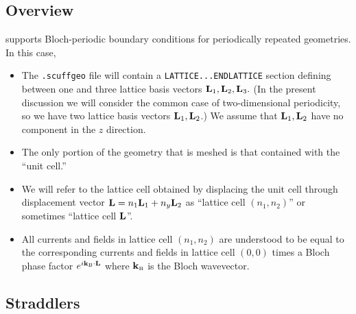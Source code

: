 \subsection{Overview}

\lss supports Bloch-periodic boundary conditions for
periodically repeated geometries. In this case,

\begin{itemize}
 \item The \texttt{.scuffgeo} file will contain
       a \texttt{LATTICE...ENDLATTICE} section defining 
       between one and three lattice basis vectors 
       $\mathbf{L}_1, \mathbf{L}_2, \mathbf{L}_3.$ (In the present 
       discussion we will consider the common case
       of two-dimensional periodicity, so we have two
       lattice basis vectors $\mathbf{L}_1, \mathbf{L}_2$.) 
       We assume that $\mathbf{L}_1, \mathbf{L}_2$ have no 
       component in the $z$ direction.
 \item The only portion of the geometry that is
       meshed is that contained with the ``unit cell.''
 \item We will refer to the lattice cell obtained by 
       displacing the unit cell through displacement 
       vector $\mathbf{L}=n_1 \mathbf{L}_1 + n_y \mathbf{L}_2$ as 
       ``lattice cell $(n_1, n_2)$'' or sometimes
       ``lattice cell $\mathbf{L}$''.
 \item All currents and fields in lattice cell $(n_1,n_2)$
       are understood to be equal to the corresponding
       currents and fields in lattice cell $(0,0)$ times
       a Bloch phase factor $e^{i\mathbf{k}_{\hbox{\tiny{B}}} \cdot \mathbf{L}}$ where
       $\mathbf{k}_{\hbox{\tiny{B}}}$ is the Bloch wavevector.
\end{itemize}

\subsection{Straddlers}

